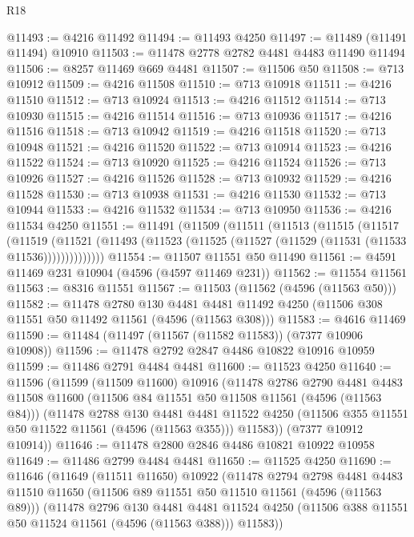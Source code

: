 \begin{lexlean}{R18}
\begin{coremodule}
@11493 := @4216 @11492
@11494 := @11493 @4250
@11497 := @11489 (@11491 @11494) @10910
@11503 := @11478 @2778 @2782 @4481 @4483 @11490 @11494
@11506 := @8257 @11469 @669 @4481
@11507 := @11506 @50
@11508 := @713 @10912
@11509 := @4216 @11508
@11510 := @713 @10918
@11511 := @4216 @11510
@11512 := @713 @10924
@11513 := @4216 @11512
@11514 := @713 @10930
@11515 := @4216 @11514
@11516 := @713 @10936
@11517 := @4216 @11516
@11518 := @713 @10942
@11519 := @4216 @11518
@11520 := @713 @10948
@11521 := @4216 @11520
@11522 := @713 @10914
@11523 := @4216 @11522
@11524 := @713 @10920
@11525 := @4216 @11524
@11526 := @713 @10926
@11527 := @4216 @11526
@11528 := @713 @10932
@11529 := @4216 @11528
@11530 := @713 @10938
@11531 := @4216 @11530
@11532 := @713 @10944
@11533 := @4216 @11532
@11534 := @713 @10950
@11536 := @4216 @11534 @4250
@11551 := @11491
    (@11509
      (@11511
        (@11513
          (@11515
            (@11517
              (@11519
                (@11521 (@11493 (@11523 (@11525 (@11527 (@11529 (@11531 (@11533 @11536))))))))))))))
@11554 := @11507 @11551 @50 @11490
@11561 := @4591 @11469 @231 @10904 (@4596 (@4597 @11469 @231))
@11562 := @11554 @11561
@11563 := @8316 @11551
@11567 := @11503 (@11562 (@4596 (@11563 @50)))
@11582 := @11478
    @2780
    @130
    @4481
    @4481
    @11492
    @4250
    (@11506 @308 @11551 @50 @11492 @11561 (@4596 (@11563 @308)))
@11583 := @4616 @11469
@11590 := @11484 (@11497 (@11567 (@11582 @11583)) (@7377 @10906 @10908))
@11596 := @11478 @2792 @2847 @4486 @10822 @10916 @10959
@11599 := @11486 @2791 @4484 @4481
@11600 := @11523 @4250
@11640 := @11596
    (@11599
      (@11509 @11600)
      @10916
      (@11478
        @2786
        @2790
        @4481
        @4483
        @11508
        @11600
        (@11506 @84 @11551 @50 @11508 @11561 (@4596 (@11563 @84)))
        (@11478
          @2788
          @130
          @4481
          @4481
          @11522
          @4250
          (@11506 @355 @11551 @50 @11522 @11561 (@4596 (@11563 @355)))
          @11583))
      (@7377 @10912 @10914))
@11646 := @11478 @2800 @2846 @4486 @10821 @10922 @10958
@11649 := @11486 @2799 @4484 @4481
@11650 := @11525 @4250
@11690 := @11646
    (@11649
      (@11511 @11650)
      @10922
      (@11478
        @2794
        @2798
        @4481
        @4483
        @11510
        @11650
        (@11506 @89 @11551 @50 @11510 @11561 (@4596 (@11563 @89)))
        (@11478
          @2796
          @130
          @4481
          @4481
          @11524
          @4250
          (@11506 @388 @11551 @50 @11524 @11561 (@4596 (@11563 @388)))
          @11583))

\end{coremodule}
\end{lexlean}
